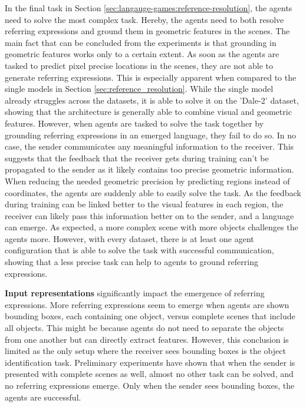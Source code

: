 In the final task in Section \ref{sec:langauge-games:reference-resolution}, the agents need to solve the most complex task.
Hereby, the agents need to both resolve referring expressions and ground them in geometric features in the scenes.
The main fact that can be concluded from the experiments is that grounding in geometric features works only to a certain extent.
As soon as the agents are tasked to predict pixel precise locations in the scenes, they are not able to generate referring expressions.
This is especially apparent when compared to the single models in Section \ref{sec:reference_resolution}.
While the single model already struggles across the datasets, it is able to solve it on the 'Dale-2' dataset, showing that the architecture is generally able to combine visual and geometric features.
However, when agents are tasked to solve the task together by grounding referring expressions in an emerged language, they fail to do so.
In no case, the sender communicates any meaningful information to the receiver.
This suggests that the feedback that the receiver gets during training can't be propagated to the sender as it likely contains too precise geometric information.
When reducing the needed geometric precision by predicting regions instead of coordinates, the agents are suddenly able to easily solve the task.
As the feedback during training can be linked better to the visual features in each region, the receiver can likely pass this information better on to the sender, and a language can emerge.
As expected, a more complex scene with more objects challenges the agents more.
However, with every dataset, there is at least one agent configuration that is able to solve the task with successful communication, showing that a less precise task can help to agents to ground referring expressions.

\textbf{Input representations} significantly impact the emergence of referring expressions.
More referring expressions seem to emerge when agents are shown bounding boxes, each containing one object, versus complete scenes that include all objects.
This might be because agents do not need to separate the objects from one another but can directly extract features.
However, this conclusion is limited as the only setup where the receiver sees bounding boxes is the object identification task.
Preliminary experiments have shown that when the sender is presented with complete scenes as well, almost no other task can be solved, and no referring expressions emerge.
Only when the sender sees bounding boxes, the agents are successful.

